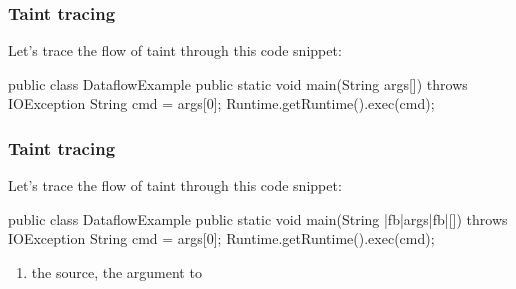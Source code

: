 \documentclass[aspectratio=169, handout]{beamer}
\begin{document}
\begin{frame}[fragile]
  \frametitle{Taint tracing}

  \begin{minipage}[t][1.6in][t]{\textwidth}
    Let's trace the flow of taint through this code snippet:

    \begin{pythoncodeblock}[language=java]
      public class DataflowExample {
        public static void main(String args[]) throws IOException {
          String cmd = args[0];
          Runtime.getRuntime().exec(cmd);
        }
      }
    \end{pythoncodeblock}
  \end{minipage}
  \begin{minipage}[t][1in][t]{\textwidth}
  \end{minipage}
\end{frame}


\begin{frame}[fragile]
  \frametitle{Taint tracing}

  \begin{minipage}[t][1.6in][t]{\textwidth}
    Let's trace the flow of taint through this code snippet:

    \begin{pythoncodeblock}[language=java]
      public class DataflowExample {
        public static void main(String |fb|args|fb|[]) throws IOException {
          String cmd = args[0];
          Runtime.getRuntime().exec(cmd);
        }
      }
    \end{pythoncodeblock}
  \end{minipage}
  \begin{minipage}[t][1in][t]{\textwidth}
    \begin{enumerate}
      \item the {\color{sourceColor}source}, the  argument to 
    \end{enumerate}
  \end{minipage}
\end{frame}
\end{document}

